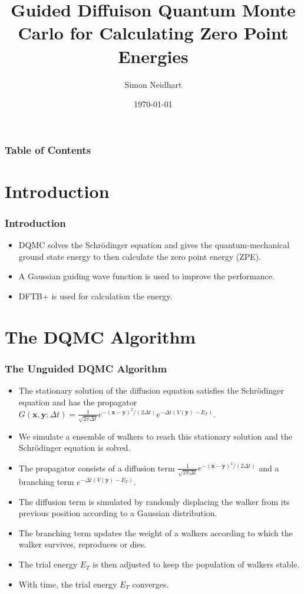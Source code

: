\documentclass{beamer}
\title{Guided Diffuison Quantum Monte Carlo for Calculating Zero Point Energies}
\author{Simon Neidhart}
\institute{Department of Physics, University of Basel}
\date{\today}
\begin{document}
\frame{\titlepage}

\begin{frame}
\frametitle{Table of Contents}
\tableofcontents
\end{frame}

\section{Introduction}
\begin{frame}
\frametitle{Introduction}
\begin{itemize}
\item DQMC solves the Schrödinger equation and gives the quantum-mechanical ground state energy to then calculate the zero point energy (ZPE).
\item A Gaussian guiding wave function is used to improve the performance.
\item DFTB+ is used for calculation the energy.\cite{dftbp}
\end{itemize}
\end{frame}

\section{The DQMC Algorithm}
\begin{frame}
\frametitle{The Unguided DQMC Algorithm \cite{mccoy}}
\begin{itemize}
\item The stationary solution of the diffusion equation satisfies the Schrödinger equation and has the propagator $G(\bm{x},\bm{y};\Delta t) = \frac{1}{\sqrt{2 \pi \Delta t}} e^{-(\bm{x}-\bm{y})^2/(2\Delta t)} e^{-\Delta t (V(\bm{y}) - E_T)}$.
\item We simulate a ensemble of walkers to reach this stationary solution and the Schrödinger equation is solved.
\item The propagator consists of a diffusion term $\frac{1}{\sqrt{2 \pi \Delta t}} e^{-(\bm{x}-\bm{y})^2/(2\Delta t)}$ and a branching term $e^{-\Delta t (V(\bm{y}) - E_T)}$.
\item The diffusion term is simulated by randomly displacing the walker from its previous position according to a Gaussian distribution.
\item The branching term updates the weight of a walkers according to which the walker survives, reproduces or dies.
\item The trial energy $E_T$ is then adjusted to keep the population of walkers stable.
\item With time, the trial energy $E_T$ converges.
\end{itemize}
\end{frame}
\end{document}
